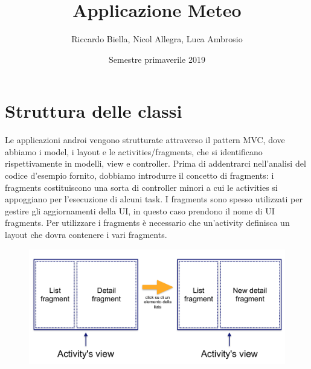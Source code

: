 \documentclass{article}
\title{\Huge Applicazione Meteo \vspace{1cm}}
\author{Riccardo Biella, Nicol Allegra, Luca Ambrosio}
\date{Semestre primaverile 2019}
\begin{document}
\maketitle
\thispagestyle{empty}
\pagebreak


\tableofcontents
\lstset{language=C++}
\pagebreak

\section{Struttura delle classi}
Le applicazioni androi vengono strutturate attraverso il pattern MVC, dove abbiamo i model, i layout e le activities/fragments, che si identificano rispettivamente in modelli, view e controller.
Prima di addentrarci nell'analisi del codice d'esempio fornito, dobbiamo introdurre il concetto di fragments: i fragments costituiscono una sorta di controller minori a cui le activities si appoggiano per l'esecuzione di alcuni task.
I fragments sono spesso utilizzati per gestire gli aggiornamenti della UI, in questo caso prendono il nome di UI fragments.
Per utilizzare i fragments è necessario che un'activity definisca un layout che dovra contenere i vari fragments.

\begin{figure}[H]
    \center
    \includegraphics[scale=0.25]{images/fig1.png}
\end{figure}
\end{document}
